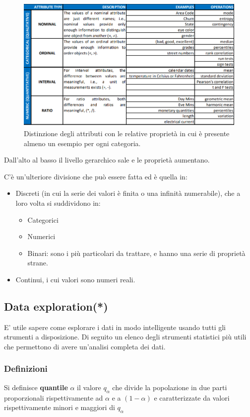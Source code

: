 \begin{figure}[H]
	\centering
	\includegraphics[height=0.5 \linewidth]{introduction/pict/attributi.png}
	\caption{Distinzione degli attributi con le relative proprietà in cui è presente almeno un esempio per ogni categoria.}
\end{figure}
Dall'alto al basso il livello gerarchico sale e le proprietà aumentano.

C'è un'ulteriore divisione che può essere fatta ed è quella in:
\begin{itemize}
	\item Discreti (in cui la serie dei valori è finita o una infinità numerabile), che a loro volta si suddividono in:
	\begin{itemize}
		\item Categorici
		\item Numerici
		\item Binari: sono i più particolari da trattare, e hanno una serie di proprietà strane.
	\end{itemize}
	\item Continui, i cui valori sono numeri reali.
\end{itemize}

\subsection{Data exploration(*)}

E' utile sapere come esplorare i dati in modo intelligente usando tutti gli strumenti a disposizione. Di seguito un elenco degli strumenti statistici più utili che permettono di avere un'analisi completa dei dati.

\subsubsection{Definizioni}
\begin{defn}
	Si definisce \textbf{quantile} $\alpha$ il valore $q_{\alpha}$ che divide la popolazione in due parti proporzionali rispettivamente ad $\alpha$ e a $(1 - \alpha)$ e caratterizzate da valori rispettivamente minori e maggiori di $q_{\alpha}$
\end{defn}

